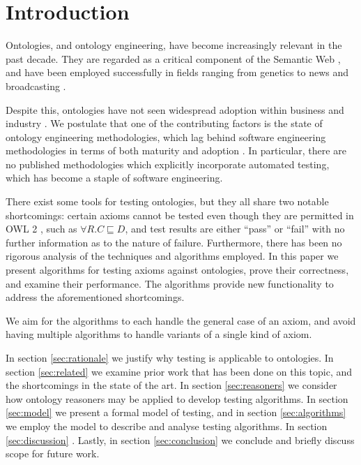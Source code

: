 \documentclass[paper.tex]{subfiles}
\begin{document}
\section{Introduction}
\label{sec:intro}

Ontologies, and ontology engineering, have become increasingly relevant in the past decade.
They are regarded as a critical component of the Semantic Web \cite{BernersLee:SemanticWeb}, and have been employed successfully in fields ranging from genetics \cite{GeneOntology:GoingForward} to news and broadcasting \cite{BBC:LinkedData}.

Despite this, ontologies have not seen widespread adoption within business and industry \cite{Cardoso:SemanticWebVision, Kaczmarek:EnterpriseModelling}.
We postulate that one of the contributing factors is the state of ontology engineering methodologies, which lag behind software engineering methodologies in terms of both maturity and adoption \cite{Iqbal:Methodologies, Simperl:Maturity}.
In particular, there are no published methodologies which explicitly incorporate automated testing, which has become a staple of software engineering.

There exist some tools for testing ontologies, but they all share two notable shortcomings: certain axioms cannot be tested even though they are permitted in OWL 2 \cite{W3C:OWL2Syntax}, such as $\forall R.C \sqsubseteq D$, and test results are either ``pass'' or ``fail'' with no further information as to the nature of failure.
Furthermore, there has been no rigorous analysis of the techniques and algorithms employed.
In this paper we present algorithms for testing axioms against ontologies, prove their correctness, and \todo[TBC] examine their performance.
The algorithms provide new functionality to address the aforementioned shortcomings.

We aim for the algorithms to each handle the general case of an axiom, and avoid having multiple algorithms to handle variants of a single kind of axiom.


In section \ref{sec:rationale} we justify why testing is applicable to ontologies.
In section \ref{sec:related} we examine prior work that has been done on this topic, and the shortcomings in the state of the art.
In section \ref{sec:reasoners} we consider how ontology reasoners may be applied to develop testing algorithms.
In section \ref{sec:model} we present a formal model of testing, and in section \ref{sec:algorithms} we employ the model to describe and analyse testing algorithms.
In section \ref{sec:discussion} .
Lastly, in section \ref{sec:conclusion} we conclude and briefly discuss scope for future work.
\end{document}
